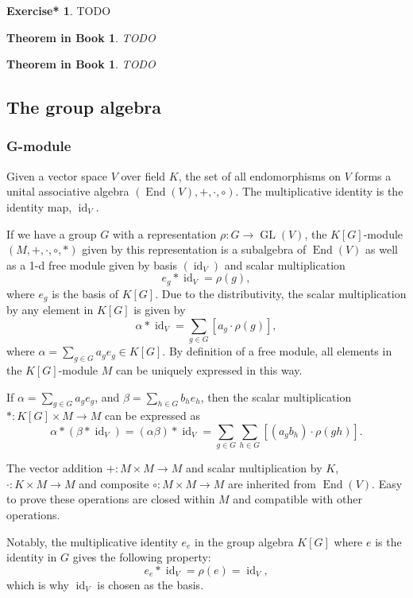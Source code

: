 \documentclass[12pt, letterpaper]{article}
\newcommand{\GL}{\operatorname{GL}}
\newcommand{\End}{\operatorname{End}}
\newcommand{\idt}{\operatorname{id}}
\newcommand{\red}[1]{{\color{red} #1}}
\theoremstyle{definition}
\theoremstyle{remark}
\theoremstyle{definition}
\newtheorem{exe*}[exe]{Exercise*}
\theoremstyle{plain}
\newtheorem{tthm}[exe]{Theorem in Book}
\numberwithin{equation}{section}
\begin{document}
	\begin{exe*}
		\red{TODO}
	\end{exe*}
	\begin{tthm}
		\red{TODO}
	\end{tthm}	
	\begin{tthm}
	\red{TODO}
	\end{tthm}	
	\subsection{The group algebra}
	
	\subsubsection{G-module}
	
	Given a vector space $V$ over field $K$,
	the set of all endomorphisms on $V$ forms a unital associative algebra $(\End(V),+,\cdot,\circ)$.
	The multiplicative identity is the identity map, $\idt_V$.
	
	If we have a group $G$ with a representation $\rho\colon G\to \GL(V)$,
	the $K[G]$-module $(M,+,\cdot,\circ,*)$ given by this representation is a subalgebra of $\End(V)$
	as well as a 1-d free module given by basis $(\idt_V)$
	and scalar multiplication
	\[e_g * \idt_V = \rho(g), \]
	where $e_g$ is the basis of $K[G]$.
	Due to the distributivity,
	the scalar multiplication by any element in $K[G]$ is given by
	\[\alpha* \idt_V=\sum_{g\in G}[a_g\cdot\rho(g)], \]
	where $\alpha = \sum_{g\in G}a_ge_g\in K[G]$.
	By definition of a free module,
	all elements in the $K[G]$-module $M$ can be uniquely expressed
	in this way.
	
	If $\alpha = \sum_{g\in G}a_ge_g$,
	and $\beta=\sum_{h\in G}b_he_h$,
	then the scalar multiplication $*\colon K[G]\times M\to M$
	can be expressed as
	\[\alpha*(\beta*\idt_V)=(\alpha\beta)*\idt_V=\sum_{g\in G}\sum_{h\in G}[(a_gb_h)\cdot\rho(gh)]. \]
	
	The vector addition $+\colon M\times M\to M$ and scalar multiplication by $K$, $\cdot\colon K \times M \to M$
	and composite $\circ \colon M\times M\to M$ are inherited from $\End(V)$.
	Easy to prove these operations are closed within $M$ and compatible with other operations.
	
	Notably, the multiplicative identity $e_e$ in the group algebra $K[G]$ where $e$ is the identity in $G$
	gives the following property:
	\[e_e*\idt_V=\rho(e)=\idt_V, \]
	which is why $\idt_V$ is chosen as the basis.
	
\end{document}
